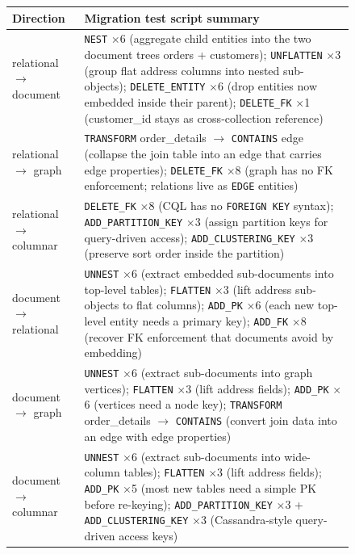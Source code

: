\begin{figure}[htbp]
\centering
\footnotesize
\begin{tabularx}{\textwidth}{@{}p{3.5cm} X@{}}
\toprule
\textbf{Direction} & \textbf{Migration test script summary} \\
\midrule

relational $\to$ document
 & \texttt{NEST} $\times$6 (aggregate child entities into the two document trees orders + customers);
   \texttt{UNFLATTEN} $\times$3 (group flat address columns into nested sub-objects);
   \texttt{DELETE\_ENTITY} $\times$6 (drop entities now embedded inside their parent);
   \texttt{DELETE\_FK} $\times$1 (customer\_id stays as cross-collection reference) \\
\midrule

relational $\to$ graph
 & \texttt{TRANSFORM} order\_details $\to$ \texttt{CONTAINS} edge (collapse the join table into an edge that carries edge properties);
   \texttt{DELETE\_FK} $\times$8 (graph has no FK enforcement; relations live as \texttt{EDGE} entities) \\
\midrule

relational $\to$ columnar
 & \texttt{DELETE\_FK} $\times$8 (CQL has no \texttt{FOREIGN KEY} syntax);
   \texttt{ADD\_PARTITION\_KEY} $\times$3 (assign partition keys for query-driven access);
   \texttt{ADD\_CLUSTERING\_KEY} $\times$3 (preserve sort order inside the partition) \\
\midrule

document $\to$ relational
 & \texttt{UNNEST} $\times$6 (extract embedded sub-documents into top-level tables);
   \texttt{FLATTEN} $\times$3 (lift address sub-objects to flat columns);
   \texttt{ADD\_PK} $\times$6 (each new top-level entity needs a primary key);
   \texttt{ADD\_FK} $\times$8 (recover FK enforcement that documents avoid by embedding) \\
\midrule

document $\to$ graph
 & \texttt{UNNEST} $\times$6 (extract sub-documents into graph vertices);
   \texttt{FLATTEN} $\times$3 (lift address fields);
   \texttt{ADD\_PK} $\times$6 (vertices need a node key);
   \texttt{TRANSFORM} order\_details $\to$ \texttt{CONTAINS} (convert join data into an edge with edge properties) \\
\midrule

document $\to$ columnar
 & \texttt{UNNEST} $\times$6 (extract sub-documents into wide-column tables);
   \texttt{FLATTEN} $\times$3 (lift address fields);
   \texttt{ADD\_PK} $\times$5 (most new tables need a simple PK before re-keying);
   \texttt{ADD\_PARTITION\_KEY} $\times$3 + \texttt{ADD\_CLUSTERING\_KEY} $\times$3 (Cassandra-style query-driven access keys) \\
\midrule


\end{tabularx}
\end{figure}
